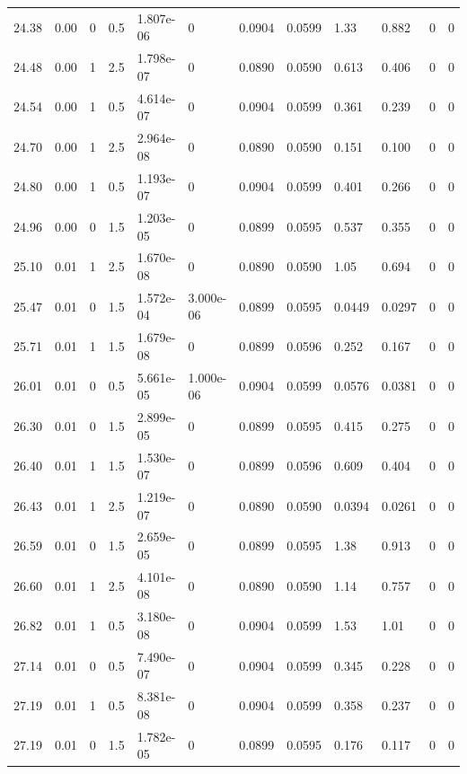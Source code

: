 \documentclass[preview]{standalone}
\begin{document}
{{{{{\begin{tabular}{L{1.2cm}C{1.2cm} C{0.3cm}C{0.5cm} C{1.4cm}C{1.4cm} C{1.4cm}C{1.4cm} C{1.6cm}C{1.6cm} C{1.6cm}C{1.6cm}}
  24.38  &  0.00  & 0     & 0.5 &  1.807e-06  & 0  &  0.0904&   0.0599& 1.33 & 0.882   &  0 & 0  \\ 
  24.48  &  0.00  & 1     & 2.5 &  1.798e-07  & 0  &  0.0890&   0.0590& 0.613 & 0.406   &  0 & 0  \\ 
  24.54  &  0.00  & 1     & 0.5 &  4.614e-07  & 0  &  0.0904&   0.0599& 0.361 & 0.239   &  0 & 0  \\ 
  24.70  &  0.00  & 1     & 2.5 &  2.964e-08  & 0  &  0.0890&   0.0590& 0.151 & 0.100   &  0 & 0  \\ 
  24.80  &  0.00  & 1     & 0.5 &  1.193e-07  & 0  &  0.0904&   0.0599& 0.401 & 0.266   &  0 & 0  \\ 
  24.96  &  0.00  & 0     & 1.5 &  1.203e-05  & 0  &  0.0899&   0.0595& 0.537 & 0.355   &  0 & 0  \\ 
  25.10  &  0.01  & 1     & 2.5 &  1.670e-08  & 0  &  0.0890&   0.0590& 1.05 & 0.694   &  0 & 0  \\ 
  25.47  &  0.01  & 0     & 1.5 &  1.572e-04  & 3.000e-06  &  0.0899&   0.0595& 0.0449 & 0.0297   &  0 & 0  \\ 
  25.71  &  0.01  & 1     & 1.5 &  1.679e-08  & 0  &  0.0899&   0.0596& 0.252 & 0.167   &  0 & 0  \\ 
  26.01  &  0.01  & 0     & 0.5 &  5.661e-05  & 1.000e-06  &  0.0904&   0.0599& 0.0576 & 0.0381   &  0 & 0  \\ 
  26.30  &  0.01  & 0     & 1.5 &  2.899e-05  & 0  &  0.0899&   0.0595& 0.415 & 0.275   &  0 & 0  \\ 
  26.40  &  0.01  & 1     & 1.5 &  1.530e-07  & 0  &  0.0899&   0.0596& 0.609 & 0.404   &  0 & 0  \\ 
  26.43  &  0.01  & 1     & 2.5 &  1.219e-07  & 0  &  0.0890&   0.0590& 0.0394 & 0.0261   &  0 & 0  \\ 
  26.59  &  0.01  & 0     & 1.5 &  2.659e-05  & 0  &  0.0899&   0.0595& 1.38 & 0.913   &  0 & 0  \\ 
  26.60  &  0.01  & 1     & 2.5 &  4.101e-08  & 0  &  0.0890&   0.0590& 1.14 & 0.757   &  0 & 0  \\ 
  26.82  &  0.01  & 1     & 0.5 &  3.180e-08  & 0  &  0.0904&   0.0599& 1.53 & 1.01   &  0 & 0  \\ 
  27.14  &  0.01  & 0     & 0.5 &  7.490e-07  & 0  &  0.0904&   0.0599& 0.345 & 0.228   &  0 & 0  \\ 
  27.19  &  0.01  & 1     & 0.5 &  8.381e-08  & 0  &  0.0904&   0.0599& 0.358 & 0.237   &  0 & 0  \\ 
  27.19  &  0.01  & 0     & 1.5 &  1.782e-05  & 0  &  0.0899&   0.0595& 0.176 & 0.117   &  0 & 0  \\ 

\end{tabular}}}}}}
\end{document}
